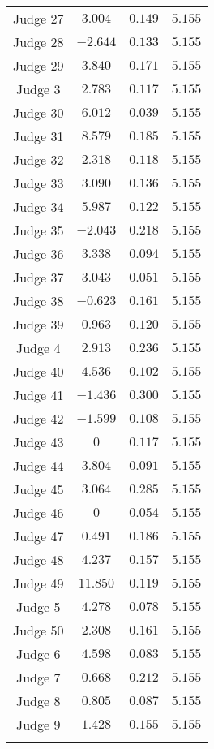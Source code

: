 \documentclass[11pt]{article}
\begin{document}
\begin{table}[H]
\begin{tabular}{@{\extracolsep{5pt}} cccc}
      Judge 27 & $3.004$ & $0.149$ & $5.155$ \\
      Judge 28 & $-2.644$ & $0.133$ & $5.155$ \\
      Judge 29 & $3.840$ & $0.171$ & $5.155$ \\
      Judge 3 & $2.783$ & $0.117$ & $5.155$ \\
      Judge 30 & $6.012$ & $0.039$ & $5.155$ \\
      Judge 31 & $8.579$ & $0.185$ & $5.155$ \\
      Judge 32 & $2.318$ & $0.118$ & $5.155$ \\
      Judge 33 & $3.090$ & $0.136$ & $5.155$ \\
      Judge 34 & $5.987$ & $0.122$ & $5.155$ \\
      Judge 35 & $-2.043$ & $0.218$ & $5.155$ \\
      Judge 36 & $3.338$ & $0.094$ & $5.155$ \\
      Judge 37 & $3.043$ & $0.051$ & $5.155$ \\
      Judge 38 & $-0.623$ & $0.161$ & $5.155$ \\
      Judge 39 & $0.963$ & $0.120$ & $5.155$ \\
      Judge 4 & $2.913$ & $0.236$ & $5.155$ \\
      Judge 40 & $4.536$ & $0.102$ & $5.155$ \\
      Judge 41 & $-1.436$ & $0.300$ & $5.155$ \\
      Judge 42 & $-1.599$ & $0.108$ & $5.155$ \\
      Judge 43 & $0$ & $0.117$ & $5.155$ \\
      Judge 44 & $3.804$ & $0.091$ & $5.155$ \\
      Judge 45 & $3.064$ & $0.285$ & $5.155$ \\
      Judge 46 & $0$ & $0.054$ & $5.155$ \\
      Judge 47 & $0.491$ & $0.186$ & $5.155$ \\
      Judge 48 & $4.237$ & $0.157$ & $5.155$ \\
      Judge 49 & $11.850$ & $0.119$ & $5.155$ \\
      Judge 5 & $4.278$ & $0.078$ & $5.155$ \\
      Judge 50 & $2.308$ & $0.161$ & $5.155$ \\
      Judge 6 & $4.598$ & $0.083$ & $5.155$ \\
      Judge 7 & $0.668$ & $0.212$ & $5.155$ \\
      Judge 8 & $0.805$ & $0.087$ & $5.155$ \\
      Judge 9 & $1.428$ & $0.155$ & $5.155$ \\
      \hline \\[-1.8ex]
      \end{tabular}
    \end{table}
\end{document}
